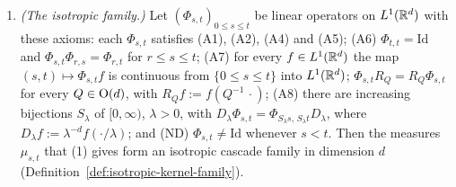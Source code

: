 \begin{lemma}
\begin{enumerate}
of the case $(\GL(d), \text{Loewner})$: each $\Phi_{\Sigma,\Sigma'}$ satisfies (A1), (A2),
(A4) and (A5); (A6) $\Phi_{\Sigma,\Sigma} = \mathrm{Id}$ and
$\Phi_{\Sigma',\Sigma''}\Phi_{\Sigma,\Sigma'} = \Phi_{\Sigma,\Sigma''}$ whenever
$\Sigma \le \Sigma' \le \Sigma''$; (A7) for every $f \in L^1(\RR^d)$ the map
$(\Sigma,\Sigma') \mapsto \Phi_{\Sigma,\Sigma'}f$ is continuous from the set of pairs into
$L^1(\RR^d)$; $D_A\Phi_{\Sigma,\Sigma'}D_A^{-1} = \Phi_{A\Sigma A^{\tp},\,A\Sigma'A^{\tp}}$ for
every $A \in \GL(d)$ and every pair; and $\Phi_{0,I} \ne \mathrm{Id}$. Then the measures form an
affine cascade family in dimension $d$ (Definition~\ref{def:affine-cascade-family}).
\item \emph{(The isotropic family.)} Let $(\Phi_{s,t})_{0 \le s \le t}$ be linear operators on
$L^1(\RR^d)$ with these axioms: each $\Phi_{s,t}$ satisfies (A1),
(A2), (A4) and (A5); (A6) $\Phi_{t,t} = \mathrm{Id}$ and $\Phi_{s,t}\Phi_{r,s} = \Phi_{r,t}$ for
$r \le s \le t$; (A7) for every $f \in L^1(\RR^d)$ the map $(s,t) \mapsto \Phi_{s,t}f$ is
continuous from $\{0 \le s \le t\}$ into $L^1(\RR^d)$; $\Phi_{s,t}R_Q = R_Q\Phi_{s,t}$ for every
$Q \in \mathrm{O}(d)$, with $R_Qf := f(Q^{-1}\,\cdot)$; (A8) there are increasing bijections
$S_\lambda$ of $[0,\infty)$, $\lambda > 0$, with
$D_\lambda\Phi_{s,t} = \Phi_{S_\lambda s,\,S_\lambda t}D_\lambda$, where
$D_\lambda f := \lambda^{-d}f(\cdot/\lambda)$; and (ND) $\Phi_{s,t} \ne \mathrm{Id}$ whenever
$s < t$. Then the measures $\mu_{s,t}$ that (1) gives form an isotropic cascade family in
dimension $d$ (Definition~\ref{def:isotropic-kernel-family}).
\end{enumerate}
\end{lemma}

